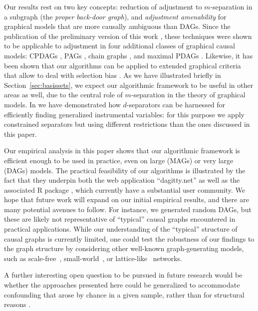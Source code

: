 Our results rest on two key concepts: reduction of adjustment to $m$-separation in a subgraph (the \emph{proper back-door graph}), and  \emph{adjustment amenability} for graphical models that are more causally ambiguous than DAGs. Since the publication of the preliminary version of this work \cite{TextorLiskiewicz2011,zander2014constructing}, these techniques were shown to be applicable to adjustment in four additional classes of graphical causal models: CPDAGs \cite{PerkovicEtAl2018}, PAGs \cite{PerkovicEtAl2018}, chain graphs \cite{vanderZander2016separators}, and maximal PDAGs \cite{PerkovicEtAl2017}. Likewise, it has been shown that our algorithms can be applied to extended graphical criteria that allow to deal with selection bias \cite{CorreaBarenboim2017}. As we have illustrated briefly in Section~\ref{sec:basissets}, we expect our algorithmic framework to be useful in other areas as well, due to the central role of $m$-separation in the theory of graphical models. In \cite{ZanderTL15,ZanderL16} we have demonstrated how $d$-separators can be harnessed for efficiently finding generalized instrumental variables: for this purpose we apply constrained separators but using different restrictions than the ones discussed in this paper. 



Our empirical analysis in this paper shows that our algorithmic framework is efficient enough to be used in practice, even on large (MAGs) or very large (DAGs) models. The practical feasibility of our algorithms is illustrated by the fact that they underpin both the web application ``dagitty.net'' as well as the associated R package \cite{dagittyIJE}, which currently have a substantial user community. We hope that future work will expand on our initial empirical results, and there are many potential avenues to follow. For instance, we generated random DAGs, but these are likely not representative of ``typical'' causal graphs encountered in practical applications. While our understanding of the ``typical'' structure of causal graphs is currently limited, one could test the robustness of our findings to the graph structure by considering other well-known graph-generating models, such as scale-free~\cite{barabasi_emergence_1999}, small-world~\cite{watts_collective_1998}, or lattice-like~\cite{Ozik2004} networks.

A further interesting open question to be pursued in future research would be whether the approaches presented here could be generalized to accommodate confounding that arose by chance in a given sample, rather than for structural reasons \cite{Greenland2015}.

